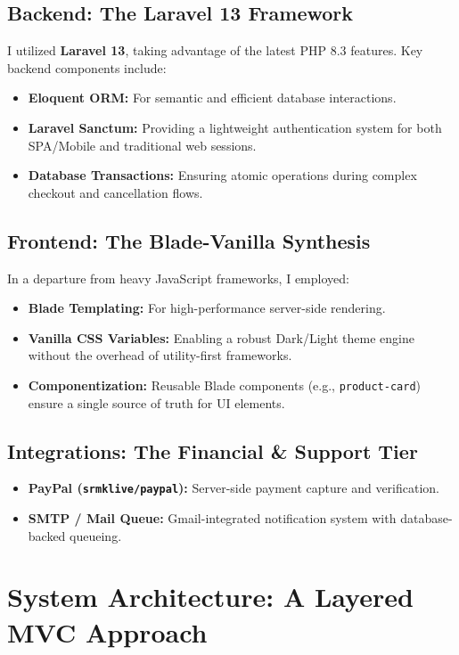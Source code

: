 \documentclass[12pt,a4paper]{article}
\begin{document}
\subsection{Backend: The Laravel 13 Framework}
I utilized \textbf{Laravel 13}, taking advantage of the latest PHP 8.3 features. Key backend components include:
\begin{itemize}
    \item \textbf{Eloquent ORM:} For semantic and efficient database interactions.
    \item \textbf{Laravel Sanctum:} Providing a lightweight authentication system for both SPA/Mobile and traditional web sessions.
    \item \textbf{Database Transactions:} Ensuring atomic operations during complex checkout and cancellation flows.
\end{itemize}

\subsection{Frontend: The Blade-Vanilla Synthesis}
In a departure from heavy JavaScript frameworks, I employed:
\begin{itemize}
    \item \textbf{Blade Templating:} For high-performance server-side rendering.
    \item \textbf{Vanilla CSS Variables:} Enabling a robust Dark/Light theme engine without the overhead of utility-first frameworks.
    \item \textbf{Componentization:} Reusable Blade components (e.g., \texttt{product-card}) ensure a single source of truth for UI elements.
\end{itemize}

\subsection{Integrations: The Financial \& Support Tier}
\begin{itemize}
    \item \textbf{PayPal (\texttt{srmklive/paypal}):} Server-side payment capture and verification.
    \item \textbf{SMTP / Mail Queue:} Gmail-integrated notification system with database-backed queueing.
\end{itemize}

\section{System Architecture: A Layered MVC Approach}
\end{document}
